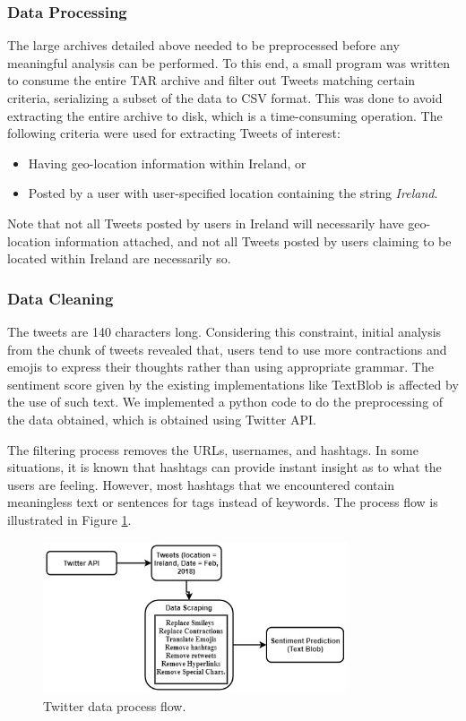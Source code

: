 \documentclass[a4paper,10pt]{article}
\begin{document}
    \subsubsection{Data Processing}

    The large archives detailed above needed to be preprocessed before any meaningful analysis can be performed. To this end, a small program was written to consume the entire TAR archive and filter out Tweets matching certain criteria, serializing a subset of the data to CSV format. This was done to avoid extracting the entire archive to disk, which is a time-consuming operation. The following criteria were used for extracting Tweets of interest:
    \begin{itemize}
        \item{
            Having geo-location information within Ireland, or
        }
        \item{
            Posted by a user with user-specified location containing the string \textit{Ireland}.
        }
    \end{itemize}

    Note that not all Tweets posted by users in Ireland will necessarily have geo-location information attached, and not all Tweets posted by users claiming to be located within Ireland are necessarily so.

    \subsubsection{Data Cleaning}

    The tweets are 140 characters long. Considering this constraint, initial analysis from the chunk of tweets revealed that, users tend to use more contractions and emojis to express their thoughts rather than using appropriate grammar. The sentiment score given by the existing implementations like TextBlob is affected by the use of such text. We implemented a python code to do the preprocessing of the data obtained, which is obtained using Twitter API.

    The filtering process removes the URLs, usernames, and hashtags. In some situations, it is known that hashtags can provide instant insight as to what the users are feeling. However, most hashtags that we encountered contain meaningless text or sentences for tags instead of keywords. The process flow is illustrated in Figure \ref{fig:twitter_process_flow}.

    \begin{figure}
        \includegraphics[width=0.8\textwidth]{twitter_process_flow.jpeg}
        \caption{Twitter data process flow.}
        \label{fig:twitter_process_flow}
    \end{figure}
\end{document}
